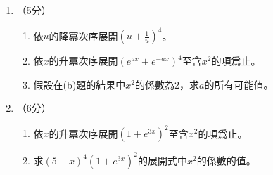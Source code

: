 \documentclass[12pt]{article}
\begin{document}
    \begin{enumerate}
        \item （5分）\begin{enumerate}
            \item 依$u$的降冪次序展開$(u+\frac{1}{u})^4$。
            \item 依$x$的升冪次序展開$(e^{ax}+e^{-ax})^4$至含$x^2$的項爲止。
            \item 假設在(b)題的結果中$x^2$的係數為2，求$a$的所有可能值。
        \end{enumerate}

        \hrulefill

        \hrulefill

        \hrulefill

        \hrulefill

        \hrulefill

        \hrulefill

        \hrulefill

        \hrulefill

        \hrulefill

        \hrulefill

        \hrulefill

        \hrulefill

        \hrulefill

        \hrulefill

        \hrulefill

        \hrulefill

        \hrulefill

        \hrulefill

        \hrulefill

        \hrulefill

        \hrulefill

        \hrulefill

        \hrulefill

        \hrulefill
        \item （6分）\begin{enumerate}
            \item 依$x$的升冪次序展開$(1+e^{3x})^2$至含$x^2$的項爲止。
            \item 求$(5-x)^4(1+e^{3x})^2$的展開式中$x^2$的係數的值。
        \end{enumerate}

        \hrulefill

        \hrulefill

        \hrulefill


\end{enumerate}
\end{document}
